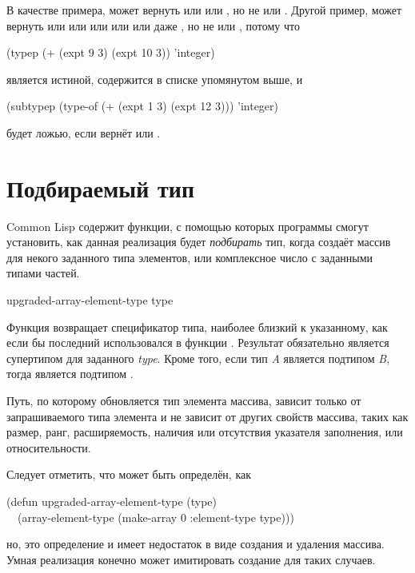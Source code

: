 \begin{defun}[Функция]
В качестве примера,  может вернуть
 или  или , но не
 или .
Другой пример,  может вернуть  или 
или  или  или  или даже , но не  или , потому что
\begin{lisp}
(typep (+ (expt 9 3) (expt 10 3)) 'integer)
\end{lisp}
является истиной,  содержится в списке упомянутом выше, и 
\begin{lisp}
(subtypep (type-of (+ (expt 1 3) (expt 12 3))) 'integer)
\end{lisp}
будет ложью, если  вернёт  или .
\end{defun}

\section{Подбираемый тип}

Common Lisp содержит функции, с помощью которых программы смогут установить, как
данная реализация будет \emph{подбирать} тип, когда создаёт массив для некого
заданного типа элементов, или комплексное число с заданными типами частей.

\begin{defun}[Функция]
upgraded-array-element-type type

Функция возвращает спецификатор типа, наиболее близкий к указанному, как если бы
последний использовался в функции .
Результат обязательно является супертипом для заданного \emph{type}.
Кроме того, если тип \emph{A} является подтипом \emph{B}, тогда 
 является подтипом
.

Путь, по которому обновляется тип элемента массива, зависит только от запрашиваемого
типа элемента и не зависит от других свойств массива, таких как размер, ранг, 
расширяемость, наличия или отсутствия указателя заполнения, или относительности.

Следует отметить, что  может быть определён,
как
\begin{lisp}
(defun upgraded-array-element-type (type) \\
~~(array-element-type (make-array 0 :element-type type)))
\end{lisp}
но, это определение и имеет недостаток в виде создания и удаления массива. Умная
реализация конечно может имитировать создание для таких случаев.
\end{defun}


